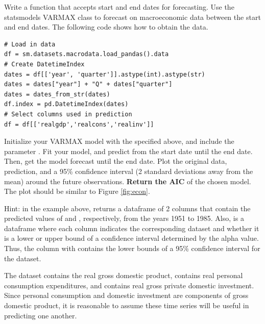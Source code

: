 \begin{problem}
\label{prob:arma:smvarma}

Write a function  that accepts start and end dates for forecasting.
Use the statsmodels VARMAX class to forecast on macroeconomic data between the start and end dates.
The following code shows how to obtain the data.

\begin{lstlisting}
# Load in data
df = sm.datasets.macrodata.load_pandas().data
# Create DatetimeIndex
dates = df[['year', 'quarter']].astype(int).astype(str)
dates = dates["year"] + "Q" + dates["quarter"]
dates = dates_from_str(dates)
df.index = pd.DatetimeIndex(dates)
# Select columns used in prediction
df = df[['realgdp','realcons','realinv']]
\end{lstlisting}

Initialize your VARMAX model with the  specified above, and include the parameter .
Fit your model, and predict from the start date until the end date.
Then, get the model forecast until the end date.
Plot the original data, prediction, and a 95\% confidence interval (2 standard deviations away from the mean) around the future observations.
\textbf{Return the AIC} of the chosen model.
The plot should be similar to Figure \ref{fig:econ}.

\noindent Hint: in the example above,  returns a dataframe of 2 columns that contain the predicted values of  and , respectively, from the years 1951 to 1985.
Also,  is a dataframe where each column indicates the corresponding dataset and whether it is a lower or upper bound of a confidence interval determined by the alpha value.
Thus, the column  with  contains the lower bounds of a 95\% confidence interval for the  dataset.

The dataset  contains the real gross domestic product,  contains real personal consumption expenditures, and  contains real gross private domestic investment.
Since personal consumption and domestic investment are components of gross domestic product, it is reasonable to assume these time series will be useful in predicting one another.

\end{problem}

